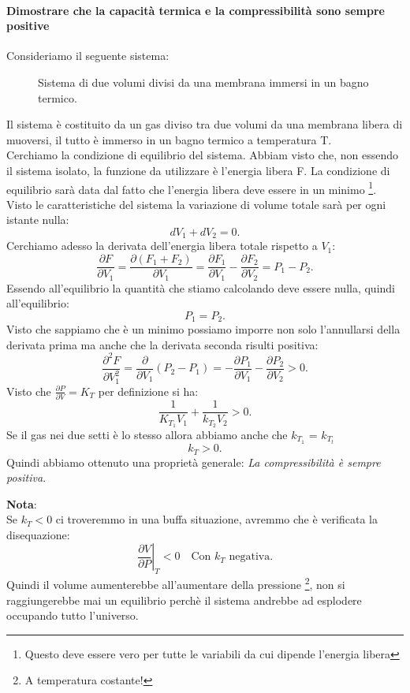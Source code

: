 \paragraph{Dimostrare che la capacità termica e la compressibilità sono sempre positive}%
Consideriamo il seguente sistema:
\begin{figure}[H]
    \centering
    \caption{Sistema di due volumi divisi da una membrana immersi in un bagno termico.}
    \label{fig:cvpositiva}
\end{figure}
\noindent
Il sistema è costituito da un gas diviso tra due volumi da una membrana libera di muoversi, il tutto è immerso in un bagno termico a temperatura T. \\
Cerchiamo la condizione di equilibrio del sistema. Abbiam visto che, non essendo il sistema isolato, la funzione da utilizzare è l'energia libera F. La condizione di equilibrio sarà data dal fatto che l'energia libera deve essere in un minimo \footnote{Questo deve essere vero per tutte le variabili da cui dipende l'energia libera}. \\
Visto le caratteristiche del sistema la variazione di volume totale sarà per ogni istante nulla:
\[
	dV_1 + dV_2= 0
.\] 
Cerchiamo adesso la derivata dell'energia libera totale rispetto a $V_1$:
\[
	\frac{\partial F}{\partial V_1} = \frac{\partial \left( F_1+F_2 \right) }{\partial V_1} = \frac{\partial F_1}{\partial V_1} - \frac{\partial F_2}{\partial V_2}= P_1 - P_2 
.\] 
Essendo all'equilibrio la quantità che stiamo calcolando deve essere nulla, quindi all'equilibrio:
\[
	P_1 = P_2
.\] 
Visto che sappiamo che è un minimo possiamo imporre non solo l'annullarsi della derivata prima ma anche che la derivata seconda risulti positiva:
\[
	\frac{\partial ^2 F}{\partial V_1^2} = \frac{\partial }{\partial V_1} \left( P_2-P_1 \right) = - \frac{\partial P_1}{\partial V_1} - \frac{\partial P_2}{\partial V_2} >0
.\] 
Visto che $\frac{\partial P}{\partial V} = K_{T}$ per definizione si ha:
\[
	\frac{1}{K_{T_1}V_1} + \frac{1}{k_{T_2}V_2} >0
.\] 
Se il gas nei due setti è lo stesso allora abbiamo anche che $k_{T_1}$ = $k_{T_t}$
\[
	k_{T} >0
.\] 
Quindi abbiamo ottenuto una proprietà generale: \textit{La compressibilità è sempre positiva}. \\
\begin{framed}
\noindent \textbf{Nota}: \\
Se $k_{T}<0$ ci troveremmo in una buffa situazione, avremmo che è verificata la disequazione:
\[
	\left.\frac{\partial V}{\partial P} \right|_{T}<0 \quad \text{Con $k_{T}$ negativa}
.\] 
Quindi il volume aumenterebbe all'aumentare della pressione \footnote{A temperatura costante!}, non si raggiungerebbe mai un equilibrio perchè il sistema andrebbe ad esplodere occupando tutto l'universo.\\
\end{framed}
